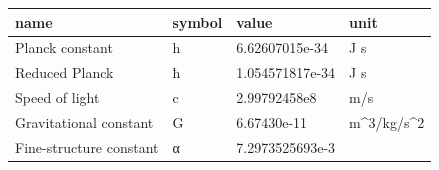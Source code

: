 \begin{tabular}{llll}
\toprule
name & symbol & value & unit \\
\midrule
Planck constant & h & 6.62607015e-34 & J s \\
Reduced Planck & ħ & 1.054571817e-34 & J s \\
Speed of light & c & 2.99792458e8 & m/s \\
Gravitational constant & G & 6.67430e-11 & m^3/kg/s^2 \\
Fine-structure constant & α & 7.2973525693e-3 &  \\
\bottomrule
\end{tabular}
